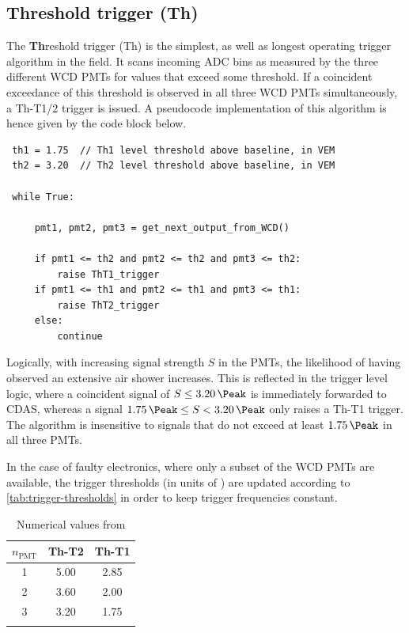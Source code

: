 \subsection{Threshold trigger (Th)}
\label{ssec:threshold-trigger}

The \textbf{Th}reshold trigger (Th) is the simplest, as well as longest operating trigger algorithm \cite{triggerGuide} in the field. It scans incoming 
ADC bins as measured by the three different WCD PMTs for values that exceed some threshold. If a coincident exceedance of this threshold is observed in 
all three WCD PMTs simultaneously, a Th-T1/2 trigger is issued. A pseudocode implementation of this algorithm is hence given by the code block below.

\begin{lstlisting}
 th1 = 1.75  // Th1 level threshold above baseline, in VEM   
 th2 = 3.20  // Th2 level threshold above baseline, in VEM  

 while True:

     pmt1, pmt2, pmt3 = get_next_output_from_WCD()

     if pmt1 <= th2 and pmt2 <= th2 and pmt3 <= th2:
         raise ThT1_trigger
     if pmt1 <= th1 and pmt2 <= th1 and pmt3 <= th1:
         raise ThT2_trigger
     else: 
         continue
\end{lstlisting}

Logically, with increasing signal strength $S$ in the PMTs, the likelihood of having observed an extensive air shower increases. This is reflected in the trigger
level logic, where a coincident signal of $S\leq\SI{3.20}{\Peak}$ is immediately forwarded to CDAS, whereas a signal $\SI{1.75}{\Peak}\leq S<\SI{3.20}{\Peak}$ 
only raises a Th-T1 trigger. The algorithm is insensitive to signals that do not exceed at least $\SI{1.75}\Peak$ in all three PMTs.

In the case of faulty electronics, where only a subset of the WCD PMTs are available, the trigger thresholds (in units of \SI{}{\Peak}) are updated according to 
\autoref{tab:trigger-thresholds} in order to keep trigger frequencies constant.

\begin{table}[h]
	\begin{center}
	\caption{Numerical values from \cite{triggerSettings}}
	\begin{tabular*}{0.4\textwidth}{@{\extracolsep{\fill}} ccc}
		\toprule
		$n_\text{PMT}$ & Th-T2 & Th-T1 \\
		\midrule
		1 & 5.00 & 2.85 \\
		2 & 3.60 & 2.00 \\
		3 & 3.20 & 1.75 \\
		\bottomrule
	\label{tab:trigger-thresholds}
	\end{tabular*}
	\end{center}
\end{table}

